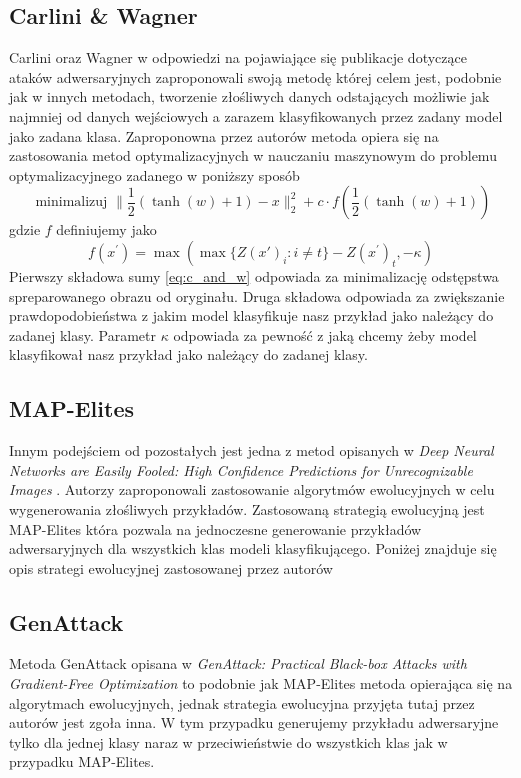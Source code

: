 \documentclass{article}
\begin{document}
\subsection{Carlini & Wagner}
Carlini oraz Wagner\cite{DBLP:journals/corr/CarliniW16a} w odpowiedzi na pojawiające się publikacje dotyczące
ataków adwersaryjnych zaproponowali swoją metodę której celem jest, podobnie jak w innych metodach,
tworzenie złośliwych danych
odstających możliwie jak najmniej od danych wejściowych a zarazem klasyfikowanych przez zadany model jako
zadana klasa. Zaproponowna przez autorów metoda opiera się na zastosowania metod optymalizacyjnych  w nauczaniu
maszynowym do problemu optymalizacyjnego zadanego w poniższy sposób
\begin{equation}\label{eq:c_and_w}
    \text { minimalizuj } \| \frac { 1 } { 2 } ( \tanh ( w ) + 1 ) - x \| _ { 2 } ^ { 2 } + c \cdot f ( \frac { 1 } { 2 } ( \tanh ( w ) + 1 ) )
\end{equation}
gdzie $f$ definiujemy jako
\begin{equation}
    f ( x ^ { \prime } ) = \max ( \max \{ Z ( x' ) _ { i } : i \neq t \} - Z ( x ^ { \prime } ) _ { t } , - \kappa)
\end{equation}
Pierwszy składowa sumy \eqref{eq:c_and_w} odpowiada za minimalizację odstępstwa spreparowanego obrazu
od oryginału. Druga składowa odpowiada za zwiększanie prawdopodobieństwa z jakim model klasyfikuje nasz przykład
jako należący do zadanej klasy. Parametr \(\kappa\) odpowiada za pewność z jaką chcemy żeby model klasyfikował nasz
przykład jako należący do zadanej klasy.


\subsection{MAP-Elites}
Innym podejściem od pozostałych jest jedna z metod opisanych w
\textit{Deep Neural Networks are Easily Fooled: High Confidence Predictions for Unrecognizable Images} \cite{DBLP:journals/corr/NguyenYC14}.
Autorzy zaproponowali zastosowanie algorytmów ewolucyjnych w celu wygenerowania złośliwych przykładów.
Zastosowaną strategią ewolucyjną jest MAP-Elites która pozwala na jednoczesne generowanie przykładów adwersaryjnych dla
wszystkich klas modeli klasyfikującego. Poniżej znajduje się opis strategi ewolucyjnej zastosowanej przez autorów

\subsection{GenAttack}
Metoda GenAttack opisana w
\textit{GenAttack: Practical Black-box Attacks with Gradient-Free Optimization}\cite{DBLP:journals/corr/abs-1805-11090}
to podobnie jak MAP-Elites metoda opierająca się na algorytmach ewolucyjnych, jednak strategia ewolucyjna
przyjęta tutaj przez autorów jest zgoła inna. W tym przypadku generujemy przykładu adwersaryjne tylko dla jednej klasy naraz
w przeciwieństwie do wszystkich klas jak w przypadku MAP-Elites.
\end{document}
